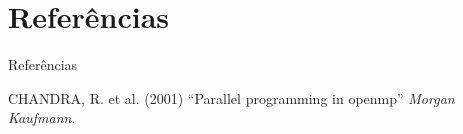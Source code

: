 \documentclass[aspectratio=169]{beamer}
\begin{document}
\section{Referências}


\begin{frame}[allowframebreaks]{Referências}
\footnotesize
{
  \begin{thebibliography}{99} %
   CHANDRA, R. et al. (2001)
  \newblock “Parallel programming in openmp”
  \newblock \emph{Morgan Kaufmann}.


  \end{thebibliography}
}



\end{frame}

\end{document}
